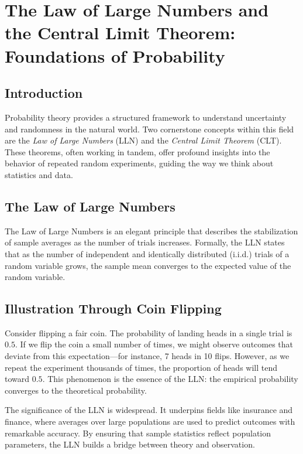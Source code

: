 

\section{The Law of Large Numbers \cite{davar} and the Central Limit Theorem: Foundations of Probability}

\subsection*{Introduction}
Probability theory provides a structured framework to understand uncertainty and randomness in the natural world. Two cornerstone concepts within this field are the \textit{Law of Large Numbers} (LLN) and the \textit{Central Limit Theorem} (CLT). These theorems, often working in tandem, offer profound insights into the behavior of repeated random experiments, guiding the way we think about statistics and data.

\subsection*{The Law of Large Numbers}
The Law of Large Numbers is an elegant principle that describes the stabilization of sample averages as the number of trials increases. Formally, the LLN states that as the number of independent and identically distributed (i.i.d.) trials of a random variable grows, the sample mean converges to the expected value of the random variable.

\subsection*{Illustration Through Coin Flipping}
Consider flipping a fair coin. The probability of landing heads in a single trial is $0.5$. If we flip the coin a small number of times, we might observe outcomes that deviate from this expectation---for instance, 7 heads in 10 flips. However, as we repeat the experiment thousands of times, the proportion of heads will tend toward $0.5$. This phenomenon is the essence of the LLN: the empirical probability converges to the theoretical probability.

The significance of the LLN is widespread. It underpins fields like insurance and finance, where averages over large populations are used to predict outcomes with remarkable accuracy. By ensuring that sample statistics reflect population parameters, the LLN builds a bridge between theory and observation.

